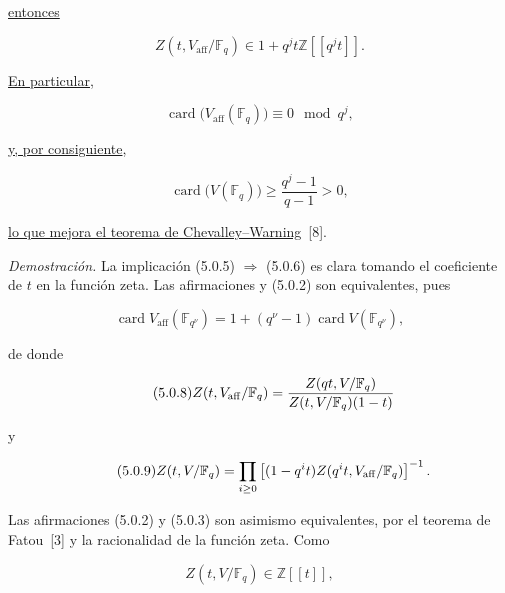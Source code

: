 \underline{entonces}

\begin{equation}\tag{5.0.5}
Z(t,V_{\mathrm{aff}}/\mathbb F_q)
\in1+q^jt\mathbb Z[[q^jt]].
\end{equation}

\underline{En particular},

\begin{equation}\tag{5.0.6}
\operatorname{card}\bigl(V_{\mathrm{aff}}(\mathbb F_q)\bigr)
\equiv0\mod{q^j},
\end{equation}

\underline{y, por consiguiente},

\begin{equation}\tag{5.0.6 bis}
\operatorname{card}\bigl(V(\mathbb F_q)\bigr)
\geq\frac{q^j-1}{q-1}>0,
\end{equation}

\underline{lo que mejora el teorema de Chevalley--Warning}~[8].

\pageoriginale

\medskip
\noindent\emph{Demostración.}
La implicación (5.0.5) $\Rightarrow$ (5.0.6) es clara tomando el
coeficiente de $t$ en la función zeta. Las afirmaciones  y (5.0.2)
son equivalentes, pues

\begin{equation}\tag{5.0.7}
\operatorname{card}V_{\mathrm{aff}}(\mathbb F_{q^\nu})
=1+(q^\nu-1)\operatorname{card}V(\mathbb F_{q^\nu}),
\end{equation}

de donde

\begin{equation}\tag{5.0.8}
Z(t,V_{\mathrm{aff}}/\mathbb F_q)
=\frac{Z(\sisi{t}{qt},V/\mathbb F_q)}
{Z(\sisi{qt}{t},V/\mathbb F_q)(1-t)}
\end{equation}

y

\begin{equation}\tag{5.0.9}
Z(t,V/\mathbb F_q)
=\prod_{i\geq0}
\left[(1-q^i\sisi{f}{t})Z(q^it,V_{\mathrm{aff}}/\mathbb F_q)\right]\sisi{}{^{-1}}.
\end{equation}

Las afirmaciones (5.0.2) y (5.0.3) son asimismo equivalentes, por el
teorema de Fatou~[3] y la racionalidad de la función zeta. Como

\begin{equation}\tag{5.0.10}
Z(t,V/\mathbb F_q)\in\mathbb Z[[t]],
\end{equation}

